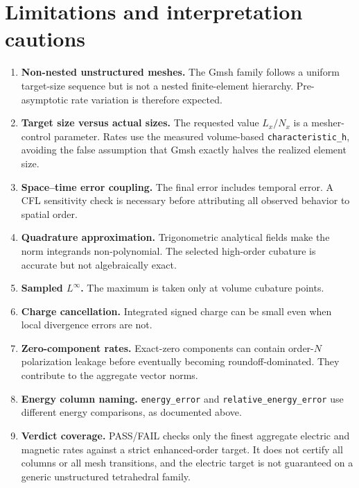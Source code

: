 \documentclass[11pt]{article}
\newcommand{\code}[1]{\nolinkurl{#1}}
\begin{document}
\section{Limitations and interpretation cautions}

\begin{enumerate}[leftmargin=*]
  \item \textbf{Non-nested unstructured meshes.}
        The Gmsh family follows a uniform target-size sequence but is not a
        nested finite-element hierarchy. Pre-asymptotic rate variation is
        therefore expected.
  \item \textbf{Target size versus actual sizes.}
        The requested value \(L_x/N_x\) is a mesher-control parameter. Rates
        use the measured volume-based \code{characteristic_h}, avoiding the
        false assumption that Gmsh exactly halves the realized element size.
  \item \textbf{Space--time error coupling.}
        The final error includes temporal error. A CFL sensitivity check is
        necessary before attributing all observed behavior to spatial order.
  \item \textbf{Quadrature approximation.}
        Trigonometric analytical fields make the norm integrands
        non-polynomial. The selected high-order cubature is accurate but not
        algebraically exact.
  \item \textbf{Sampled \(L^\infty\).}
        The maximum is taken only at volume cubature points.
  \item \textbf{Charge cancellation.}
        Integrated signed charge can be small even when local divergence
        errors are not.
  \item \textbf{Zero-component rates.}
        Exact-zero components can contain order-\(N\) polarization leakage
        before eventually becoming roundoff-dominated. They contribute to the
        aggregate vector norms.
  \item \textbf{Energy column naming.}
        \code{energy_error} and \code{relative_energy_error} use different
        energy comparisons, as documented above.
  \item \textbf{Verdict coverage.}
        PASS/FAIL checks only the finest aggregate electric and magnetic
        rates against a strict enhanced-order target. It does not certify all
        columns or all mesh transitions, and the electric target is not
        guaranteed on a generic unstructured tetrahedral family.
\end{enumerate}
\end{document}
